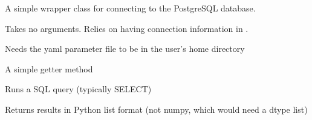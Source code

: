 \documentclass[letterpaper,10pt,english]{sphinxmanual}
\begin{document}
\begin{fulllineitems}
\label{\detokenize{db:galaxy.db.DB}}
A simple wrapper class for connecting to the PostgreSQL database.

Takes no arguments. Relies on having connection information in
.

\begin{fulllineitems}
\label{\detokenize{db:galaxy.db.DB.read_params}}
Needs the yaml parameter file to be in the user’s home directory

\end{fulllineitems}


\begin{fulllineitems}
\label{\detokenize{db:galaxy.db.DB.get_cursor}}
A simple getter method

\end{fulllineitems}


\begin{fulllineitems}
\label{\detokenize{db:galaxy.db.DB.run_query}}
Runs a SQL query (typically SELECT)

Returns results in Python list format 
(not numpy, which would need a dtype list)

\end{fulllineitems}


\begin{fulllineitems}
\label{\detokenize{db:galaxy.db.DB.get_xyz}}
\end{fulllineitems}


\end{fulllineitems}
\end{document}
